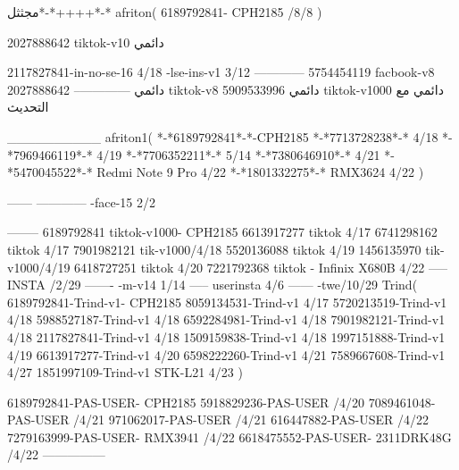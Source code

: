 مجثثل*-*++++*-*
afriton(
6189792841- CPH2185  /8/8
)

2027888642 tiktok-v10
دائمي

2117827841-in-no-se-16 4/18
-lse-ins-v1 3/12
------------
5754454119 facbook-v8
دائمي
--------------
2027888642 tiktok-v8
دائمي
5909533996 tiktok-v1000
دائمي مع التحديث

__________
afriton1(
*-*6189792841*-*-CPH2185
*-*7713728238*-* 4/18
*-*7969466119*-* 4/19
*-*7706352211*-* 5/14
*-*7380646910*-* 4/21
*-*5470045522*-* Redmi Note 9 Pro 4/22
*-*1801332275*-* RMX3624 4/22
)


------
------------
-face-15 2/2

--------
6189792841 tiktok-v1000- CPH2185 
6613917277 tiktok 4/17
6741298162 tiktok 4/17
7901982121 tik-v1000/4/18
5520136088 tiktok 4/19
1456135970 tik-v1000/4/19
6418727251 tiktok 4/20
7221792368 tiktok - Infinix X680B  4/22 
-----
 INSTA /2/29
-------
-m-v14 1/14
-----
userinsta 4/6
------
-twe/10/29
Trind(
6189792841-Trind-v1- CPH2185 
8059134531-Trind-v1  4/17
5720213519-Trind-v1  4/18
5988527187-Trind-v1  4/18
6592284981-Trind-v1  4/18
7901982121-Trind-v1  4/18
2117827841-Trind-v1  4/18
1509159838-Trind-v1  4/18
1997151888-Trind-v1  4/19
6613917277-Trind-v1  4/20
6598222260-Trind-v1  4/21
7589667608-Trind-v1  4/27
1851997109-Trind-v1 STK-L21 4/23
)

6189792841-PAS-USER- CPH2185 
5918829236-PAS-USER /4/20
7089461048-PAS-USER /4/21
971062017-PAS-USER /4/21
616447882-PAS-USER /4/22
7279163999-PAS-USER- RMX3941 /4/22
6618475552-PAS-USER- 2311DRK48G /4/22
    ---------------
